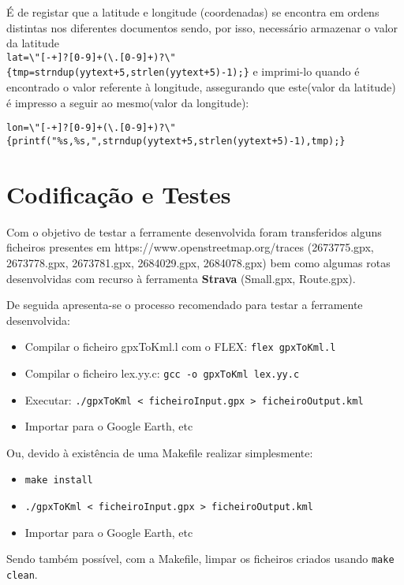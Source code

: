 \documentclass{llncs}
\begin{document}
É de registar que a latitude e longitude (coordenadas) se encontra em ordens distintas nos diferentes documentos sendo, por isso, necessário armazenar o valor da latitude \\
\verb|lat=\"[-+]?[0-9]+(\.[0-9]+)?\"  {tmp=strndup(yytext+5,strlen(yytext+5)-1);}|
e imprimi-lo quando é encontrado o valor referente à longitude, assegurando que este(valor da latitude) é impresso a seguir ao mesmo(valor da longitude): 
\begin{changemargin}{-1cm}{0cm}
\verb|lon=\"[-+]?[0-9]+(\.[0-9]+)?\"  {printf("%s,%s,",strndup(yytext+5,strlen(yytext+5)-1),tmp);}|
\end{changemargin}

\section{Codificação e Testes}
Com o objetivo de testar a ferramente desenvolvida foram transferidos alguns ficheiros presentes em https://www.openstreetmap.org/traces (2673775.gpx, 2673778.gpx, 2673781.gpx, 2684029.gpx, 2684078.gpx) bem como algumas rotas desenvolvidas com recurso à ferramenta \textbf{Strava} (Small.gpx, Route.gpx).

De seguida apresenta-se o processo recomendado para testar a ferramente desenvolvida:
\begin{itemize}
    \item Compilar o ficheiro gpxToKml.l com o FLEX: \verb|flex gpxToKml.l|
    \item Compilar o ficheiro lex.yy.c: \verb|gcc -o gpxToKml lex.yy.c|
    \item Executar: \verb|./gpxToKml < ficheiroInput.gpx > ficheiroOutput.kml|
    \item Importar para o Google Earth, etc
\end{itemize}

Ou, devido à existência de uma Makefile realizar simplesmente:
\begin{itemize}
    \item \verb|make install|
    \item \verb|./gpxToKml < ficheiroInput.gpx > ficheiroOutput.kml|
    \item Importar para o Google Earth, etc
\end{itemize}

Sendo também possível, com a Makefile, limpar os ficheiros criados usando \verb|make clean|.
\end{document}
